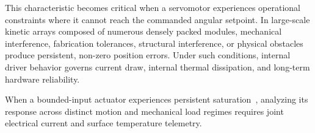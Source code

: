 \documentclass[lettersize,journal]{IEEEtran}
\begin{document}
	This characteristic becomes critical when a servomotor experiences operational constraints where it cannot reach the commanded angular setpoint. In large-scale kinetic arrays composed of numerous densely packed modules, mechanical interference, fabrication tolerances, structural interference, or physical obstacles produce persistent, non-zero position errors. Under such conditions, internal driver behavior governs current draw, internal thermal dissipation, and long-term hardware reliability.
	
	When a bounded-input actuator experiences persistent saturation~\cite{kirk2004optimal}, analyzing its response across distinct motion and mechanical load regimes requires joint electrical current and surface temperature telemetry.
	
\end{document}
